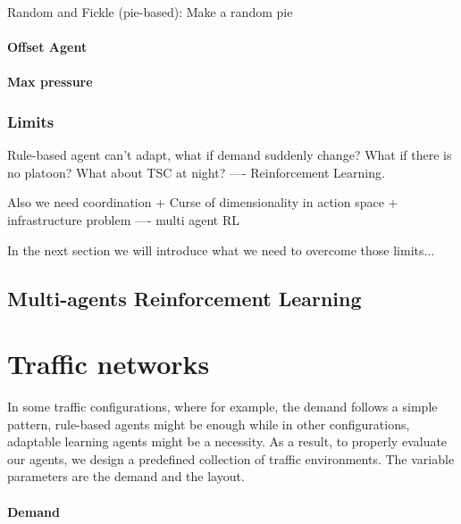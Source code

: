\documentclass{article}
\begin{document}
            Random and Fickle (pie-based): Make a random pie
            
            \paragraph{Offset Agent}
            
            \paragraph{Max pressure}
            
        \subsubsection{Limits}
            Rule-based agent can't adapt, what if demand suddenly change? What if there is no platoon? What about TSC at night? ---- Reinforcement Learning.
            
            Also we need coordination + Curse of dimensionality in action space + infrastructure problem ---- multi agent RL
            
            In the next section we will introduce what we need to overcome those limits...
            
    \subsection{Multi-agents Reinforcement Learning}

        

\section{Traffic networks}

    In some traffic configurations, where for example, the demand follows a simple pattern, rule-based agents might be enough while in other configurations, adaptable learning agents might be a necessity. As a result, to properly evaluate our agents, we design a predefined collection of traffic environments. The variable parameters are the demand and the layout.

    \paragraph{Demand}
    
\end{document}
